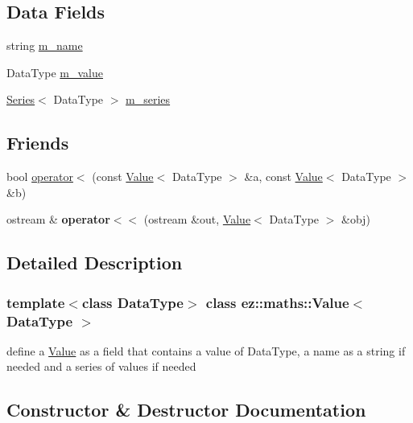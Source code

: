 \subsection*{Data Fields}
\begin{DoxyCompactItemize}
\item 
string \hyperlink{classez_1_1maths_1_1Value_a2ee76ebdeaa2dd1d8180cc40811ea36c}{m\+\_\+name}
\item 
Data\+Type \hyperlink{classez_1_1maths_1_1Value_a7894cb6036753caeed0443ccd38f2116}{m\+\_\+value}
\item 
\hyperlink{classez_1_1maths_1_1Series}{Series}$<$ Data\+Type $>$ \hyperlink{classez_1_1maths_1_1Value_a3bfd4fd59073f378c85d688bee3cb363}{m\+\_\+series}
\end{DoxyCompactItemize}
\subsection*{Friends}
\begin{DoxyCompactItemize}
\item 
bool \hyperlink{classez_1_1maths_1_1Value_a16981d384689784ee36af11bddfc2af4}{operator$<$} (const \hyperlink{classez_1_1maths_1_1Value}{Value}$<$ Data\+Type $>$ \&a, const \hyperlink{classez_1_1maths_1_1Value}{Value}$<$ Data\+Type $>$ \&b)
\item 
\mbox{\label{classez_1_1maths_1_1Value_a2804de4c37a14418af6cea5991081a19}} 
ostream \& {\bfseries operator$<$$<$} (ostream \&out, \hyperlink{classez_1_1maths_1_1Value}{Value}$<$ Data\+Type $>$ \&obj)
\end{DoxyCompactItemize}


\subsection{Detailed Description}
\subsubsection*{template$<$class Data\+Type$>$\newline
class ez\+::maths\+::\+Value$<$ Data\+Type $>$}

define a \hyperlink{classez_1_1maths_1_1Value}{Value} as a field that contains a value of Data\+Type, a name as a string if needed and a series of values if needed 

\subsection{Constructor \& Destructor Documentation}
\mbox{\label{classez_1_1maths_1_1Value_ac21c584a161b8e6d8bc9871b7b1bfa97}} 
